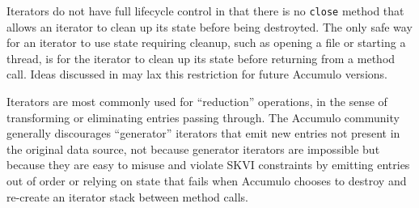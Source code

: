 Iterators do not have full lifecycle control in that there is no \texttt{close} method 
that allows an iterator to clean up its state before being destroyted. The only safe way for an 
iterator to use state requiring cleanup, such as opening a file or starting a thread,
is for the iterator to clean up its state before returning from a method call.
Ideas discussed in \cite{ACCUMULO-3751} may lax this restriction for future Accumulo versions.


Iterators are most commonly used for ``reduction'' operations, in the sense of transforming
or eliminating entries passing through.  The Accumulo community generally discourages ``generator'' iterators 
that emit new entries not present in the original data source, not because generator iterators are impossible 
but because they are easy to misuse and violate SKVI constraints by emitting entries out of order or 
relying on state that fails when Accumulo chooses to destroy and re-create an iterator stack between method calls.

